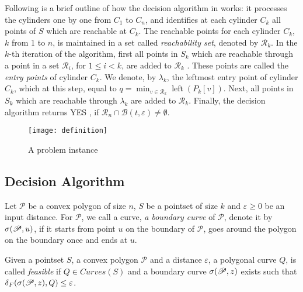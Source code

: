 \documentclass[a4paper,UKenglish]{lipics}
\newcommand{\lee}{\leqslant}
\newcommand{\eps}{\varepsilon}
\newcommand{\CR}{{\mathscr R}}
\newcommand{\CB}{{\mathscr B}}
\newcommand{\Pol}{{\mathscr P}}
\newcommand{\R}{\CR}
\newcommand{\distF}{\delta_F}
\DeclareMathOperator{\Left}{left}
\newcommand{\pset}{S}
\newcommand{\lme}[1]{{\lambda_{#1}}}
\begin{document}
Following is a brief outline of how the decision 
algorithm in \cite{cccg11} works: 
it processes the cylinders one by one from 
$C_1$ to $C_{n}$, and identifies at each cylinder $C_k$
all points of $\pset$ which are reachable at $C_k$.
The reachable points for each cylinder $C_k$, $k$ from 1 to $n$, is maintained in a set
called {\em reachability set}, denoted by $\R_k$.
In the $k$-th iteration of the algorithm,
first all points in $\pset_k$
which are reachable through a point in a set 
$\R_i$, for $1 \lee i < k$, are added to $\R_k$ .
These points are called the \emph{entry points} of cylinder $C_k$. 
We denote, by $\lme{k}$, the leftmost 
entry point of cylinder $C_k$, which 
at this step, equal to $q = \min_{v \in \R_k}{\Left(P_k[v])}$.
Next,  all points in $\pset_k$
which are reachable through $\lme{k}$
are added to $\R_k$.
Finally, the decision algorithm 
returns YES , if  
$\R_n \cap \CB(t,\eps) \not= \emptyset$.





















 




\begin{figure}[t]
	\centering
	\texttt{[image: definition]}
	\caption{A problem instance}
	\label{fig:types}
\end{figure}


\subsection {Decision Algorithm}\label{subsec:decAlg}


Let $\Pol$ be a convex polygon of size $n$, 
$S$ be a pointset of size $k$ and $\eps \ge 0$ be an input distance. 
For $\Pol$, we call a curve, {\em a boundary curve} of $\Pol$, denote it by $\bounC{u}$,
if it starts from point $u$ on the boundary of $\Pol$, 
goes around the polygon on the boundary once and ends at 
$u$.



\begin{definition} \label{def:feasible}
Given a pointset $S$, a convex polygon $\Pol$ and a distance $\eps$,  
a polygonal curve $Q$,
is called {\em feasible} if 
$Q \in Curves(S)$ and a boundary curve $\bounC{z}$ exists such that 
$\distF(\bounC{z},Q) \le \eps$.
\end{definition}
\end{document}
